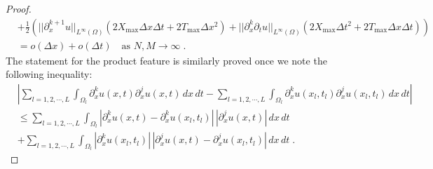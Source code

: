 \documentclass[a4paper,11pt]{article}
\theoremstyle{definition}
\begin{document}
\begin{proof}
\begin{align*}
&+\frac{1}{2}(||\partial_x^{k+1}u||_{L^\infty(\Omega)}(2X_{\max}\Delta x\Delta t+2T_{\max}\Delta x^2 )
+ ||\partial_x^{k}\partial_tu||_{L^\infty(\Omega)}(2X_{\max}\Delta t^2+2T_{\max}\Delta x\Delta t))\\
&=o(\Delta x)+o(\Delta t)\quad \text{as~}N,M\to\infty\;.
\end{align*}
The statement for the product feature is similarly proved once we note the following inequality:
\begin{align*}
&\left|\sum_{l=1,2,\cdots,L}\int_{\Omega_l}\partial_x^ku(x,t)\partial_x^ju(x,t)\,dx\,dt-\sum_{l=1,2,\cdots,L}\int_{\Omega_l}\partial_x^ku(x_l,t_l)\partial_x^ju(x_l,t_l)\,dx\,dt \right|\\
&\leq\sum_{l=1,2,\cdots,L}\int_{\Omega_l}|\partial_x^ku(x,t)-\partial_x^ku(x_l,t_l)|\,|\partial_x^ju(x,t)|\,dx\,dt\\
&+ \sum_{l=1,2,\cdots,L}\int_{\Omega_l}|\partial_x^ku(x_l,t_l)|\,|\partial_x^ju(x,t)-\partial_x^ju(x_l,t_l)|\,dx\,dt\;.
\end{align*}
\end{proof}



\end{document}
